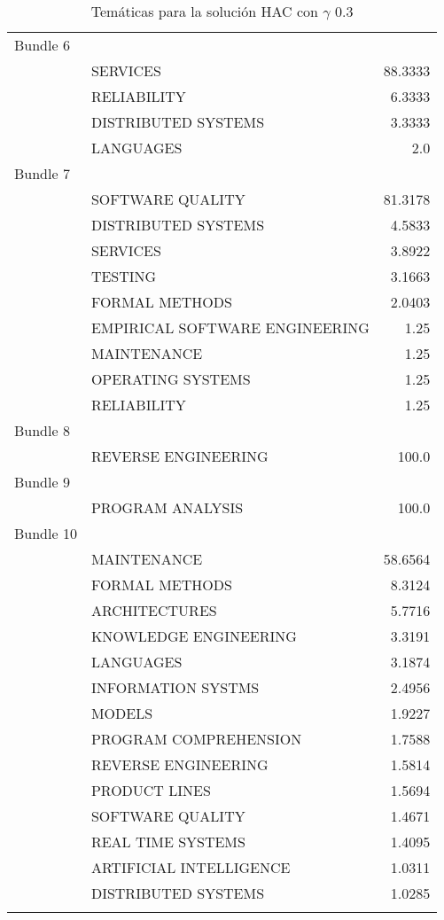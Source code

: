 \begin{center}
\begin{longtable}{|llr|}
Bundle 6 & ~ & ~ \\
 ~ & SERVICES & 88.3333 \\
 ~ & RELIABILITY & 6.3333 \\
 ~ & DISTRIBUTED SYSTEMS & 3.3333 \\
 ~ & LANGUAGES & 2.0 \\
Bundle 7 & ~ & ~ \\
 ~ & SOFTWARE QUALITY & 81.3178 \\
 ~ & DISTRIBUTED SYSTEMS & 4.5833 \\
 ~ & SERVICES & 3.8922 \\
 ~ & TESTING & 3.1663 \\
 ~ & FORMAL METHODS & 2.0403 \\
 ~ & EMPIRICAL SOFTWARE ENGINEERING & 1.25 \\
 ~ & MAINTENANCE & 1.25 \\
 ~ & OPERATING SYSTEMS & 1.25 \\
 ~ & RELIABILITY & 1.25 \\
Bundle 8 & ~ & ~ \\
 ~ & REVERSE ENGINEERING & 100.0 \\
Bundle 9 & ~ & ~ \\
 ~ & PROGRAM ANALYSIS & 100.0 \\
Bundle 10 & ~ & ~ \\
 ~ & MAINTENANCE & 58.6564 \\
 ~ & FORMAL METHODS & 8.3124 \\
 ~ & ARCHITECTURES & 5.7716 \\
 ~ & KNOWLEDGE ENGINEERING & 3.3191 \\
 ~ & LANGUAGES & 3.1874 \\
 ~ & INFORMATION SYSTMS & 2.4956 \\
 ~ & MODELS & 1.9227 \\
 ~ & PROGRAM COMPREHENSION & 1.7588 \\
 ~ & REVERSE ENGINEERING & 1.5814 \\
 ~ & PRODUCT LINES & 1.5694 \\
 ~ & SOFTWARE QUALITY & 1.4671 \\
 ~ & REAL TIME SYSTEMS & 1.4095 \\
 ~ & ARTIFICIAL INTELLIGENCE & 1.0311 \\
 ~ & DISTRIBUTED SYSTEMS & 1.0285 \\
    \hline
  \caption {Temáticas para la solución HAC con $\gamma$ 0.3}
\end{longtable}
\end{center}

